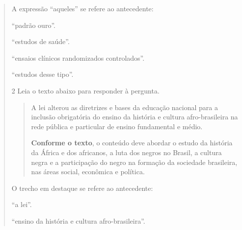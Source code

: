\begin{quote}
{\begin{quote}
\end{quote}


A expressão ``aqueles'' se refere ao antecedente:

\begin{escolha}

  \item ``padrão ouro''.
  
  \item ``estudos de saúde''.
  
  \item ``ensaios clínicos randomizados controlados''.
  
  \item ``estudos desse tipo''. 

\end{escolha}


\num{2} Leia o texto abaixo para responder à pergunta.

\begin{quote}

A lei alterou as diretrizes e bases da educação nacional para a
inclusão obrigatória do ensino da história e cultura afro-brasileira na
rede pública e particular de ensino fundamental e médio.

\textbf{Conforme o texto}, o conteúdo deve abordar o estudo da história
da África e dos africanos, a luta dos negros no Brasil, a cultura negra
e a participação do negro na formação da sociedade brasileira, nas áreas
social, econômica e política.

\end{quote}


O trecho em destaque se refere ao antecedente:

\begin{escolha}
  
  \item ``a lei''.
  
  \item ``ensino da história e cultura afro-brasileira''.
  

\end{escolha}}
\end{quote}
